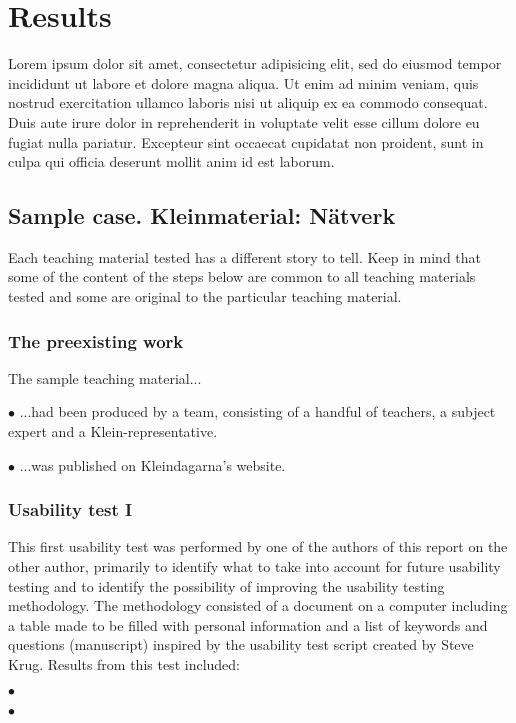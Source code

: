 \chapter{Results}
Lorem ipsum dolor sit amet, consectetur adipisicing elit, sed do eiusmod tempor incididunt ut labore et dolore magna aliqua. Ut enim ad minim veniam, quis nostrud exercitation ullamco laboris nisi ut aliquip ex ea commodo consequat. Duis aute irure dolor in reprehenderit in voluptate velit esse cillum dolore eu fugiat nulla pariatur. Excepteur sint occaecat cupidatat non proident, sunt in culpa qui officia deserunt mollit anim id est laborum.

\section{Sample case. Kleinmaterial: Nätverk}
Each teaching material tested has a different story to tell. Keep in mind that some of the content of the steps below are common to all teaching materials tested and some are original to the particular teaching material.

\subsection{The preexisting work}
The sample teaching material...
\begin{description}
    \item $\bullet$ ...had been produced by a team, consisting of a handful of teachers, a subject expert and a Klein-representative.
    \item $\bullet$ ...was published on Kleindagarna's website.
\end{description}

\subsection{Usability test I}
This first usability test was performed by one of the authors of this report on the other author, primarily to identify what to take into account for future usability testing and to identify the possibility of improving the usability testing methodology. The methodology consisted of a document on a computer including a table made to be filled with personal information and a list of keywords and questions (manuscript) inspired by the usability test script created by Steve Krug. Results from this test included:
\begin{description}
    \item $\bullet$
    \item $\bullet$
\end{description}
